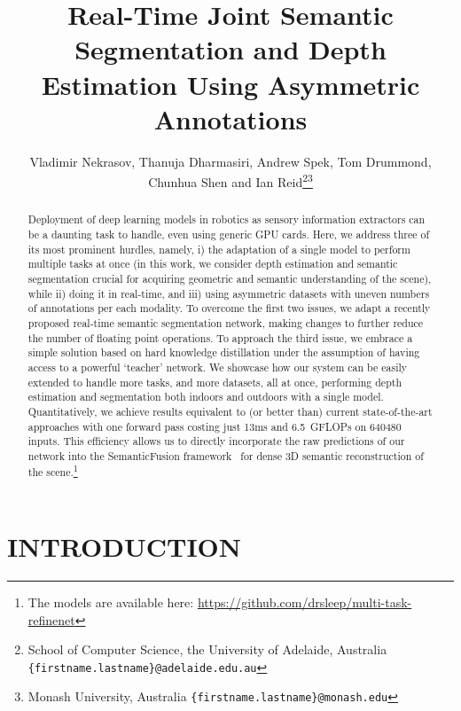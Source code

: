 \documentclass[letterpaper, 10 pt, conference]{ieeeconf}
\title{\LARGE \bf
Real-Time Joint Semantic Segmentation and Depth Estimation Using Asymmetric Annotations
}
\author{Vladimir Nekrasov, Thanuja Dharmasiri, Andrew Spek, Tom Drummond, Chunhua Shen and Ian Reid\thanks{School of Computer Science, the University of Adelaide, Australia
        {\tt\small \{firstname.lastname\}@adelaide.edu.au}}\thanks{Monash University, Australia \newline
        {\tt\small \{firstname.lastname\}@monash.edu}}}
\begin{document}
\def\etal{\emph{et al.}}


\maketitle
\thispagestyle{empty}
\pagestyle{empty}


\begin{abstract}
	Deployment of deep learning models in robotics as sensory information extractors can be a daunting task to handle, even using generic GPU cards. Here, we address three of its most prominent hurdles, namely, i) the adaptation of a single model to perform multiple tasks at once (in this work, we consider depth estimation and semantic segmentation crucial for acquiring geometric and semantic understanding of the scene), while ii) doing it in real-time, and iii) using asymmetric datasets with uneven numbers of annotations per each modality. To overcome the first two issues, we adapt a recently proposed real-time semantic segmentation network, making changes to further reduce the number of floating point operations. To approach the third issue, we embrace a simple solution based on hard knowledge distillation under the assumption of having access to a powerful `teacher' network. We showcase how our system can be easily extended to handle more tasks, and more datasets, all at once, performing depth estimation and segmentation both indoors and outdoors with a single model. Quantitatively, we achieve results equivalent to (or better than) current state-of-the-art approaches with one forward pass costing just 13ms and 6.5~GFLOPs on 640480 inputs. This efficiency allows us to directly incorporate the raw predictions of our network into the SemanticFusion framework~\cite{McCormacHDL17} for dense 3D semantic reconstruction of the scene.\footnote[3]{The models are available here: {\url{https://github.com/drsleep/multi-task-refinenet}}}
\end{abstract}


\section{INTRODUCTION}
\end{document}
